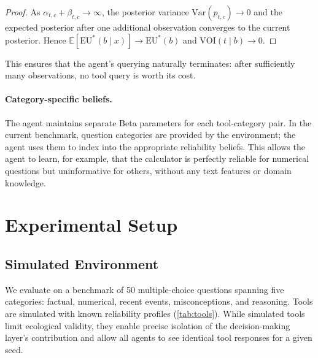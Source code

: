\documentclass[11pt]{article}
\newcommand{\EU}{\mathrm{EU}}
\newcommand{\VOI}{\mathrm{VOI}}
\newcommand{\E}{\mathbb{E}}
\begin{document}
\begin{proof}
As $\alpha_{t,c} + \beta_{t,c} \to \infty$, the posterior variance $\mathrm{Var}(p_{t,c}) \to 0$ and the expected posterior after one additional observation converges to the current posterior. Hence $\E[\EU^*(b \mid x)] \to \EU^*(b)$ and $\VOI(t \mid b) \to 0$.
\end{proof}

This ensures that the agent's querying naturally terminates: after sufficiently many observations, no tool query is worth its cost.

\paragraph{Category-specific beliefs.}
The agent maintains separate Beta parameters for each tool-category pair. In the current benchmark, question categories are provided by the environment; the agent uses them to index into the appropriate reliability beliefs. This allows the agent to learn, for example, that the calculator is perfectly reliable for numerical questions but uninformative for others, without any text features or domain knowledge.


\section{Experimental Setup}
\label{sec:setup}

\subsection{Simulated Environment}

We evaluate on a benchmark of 50 multiple-choice questions spanning five categories: factual, numerical, recent events, misconceptions, and reasoning. Tools are simulated with known reliability profiles (\cref{tab:tools}). While simulated tools limit ecological validity, they enable precise isolation of the decision-making layer's contribution and allow all agents to see identical tool responses for a given seed.
\end{document}
